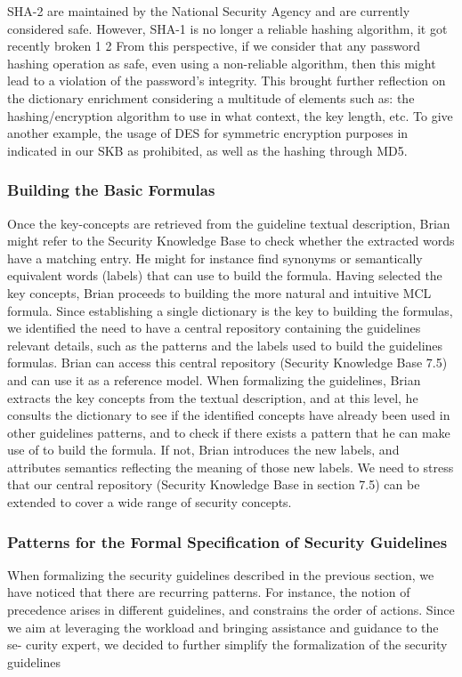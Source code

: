 \documentclass[10pt]{article}
\begin{document}
SHA-2 are maintained by the National Security Agency and are currently considered
safe. However, SHA-1 is no longer a reliable hashing algorithm, it got recently broken
1 2
From this perspective, if we consider that any password hashing operation as safe, even
using a non-reliable algorithm, then this might lead to a violation of the password’s
integrity. This brought further reflection on the dictionary enrichment considering a
multitude of elements such as: the hashing/encryption algorithm to use in what context,
the key length, etc. To give another example, the usage of DES for symmetric encryption
purposes in indicated in our SKB as prohibited, as well as the hashing through MD5.

\subsubsection{Building the Basic Formulas}
Once the key-concepts are retrieved from the guideline textual description, Brian might
refer to the Security Knowledge Base to check whether the extracted words have a
matching entry. He might for instance find synonyms or semantically equivalent words
(labels) that can use to build the formula. Having selected the key concepts, Brian
proceeds to building the more natural and intuitive MCL formula.
Since establishing a single dictionary is the key to building the formulas, we identified
the need to have a central repository containing the guidelines relevant details, such
as the patterns and the labels used to build the guidelines formulas. Brian can access
this central repository (Security Knowledge Base 7.5) and can use it as a reference model. When formalizing the guidelines, Brian extracts the key concepts from the
textual description, and at this level, he consults the dictionary to see if the identified
concepts have already been used in other guidelines patterns, and to check if there exists
a pattern that he can make use of to build the formula. If not, Brian introduces the
new labels, and attributes semantics reflecting the meaning of those new labels. We
need to stress that our central repository (Security Knowledge Base in section 7.5) can
be extended to cover a wide range of security concepts.

\subsubsection{Patterns for the Formal Specification of Security Guidelines}
When formalizing the security guidelines described in the previous section, we have
noticed that there are recurring patterns. For instance, the notion of precedence arises
in different guidelines, and constrains the order of actions.
Since we aim at leveraging the workload and bringing assistance and guidance to the se-
curity expert, we decided to further simplify the formalization of the security guidelines
\end{document}

